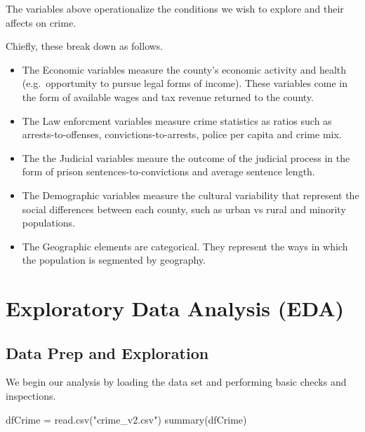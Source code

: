 \documentclass[]{article}
\newenvironment{Shaded}{}{}
\newcommand{\KeywordTok}[1]{\textcolor[rgb]{0.00,0.00,1.00}{#1}}
\newcommand{\NormalTok}[1]{#1}
\newcommand{\StringTok}[1]{\textcolor[rgb]{0.00,0.50,0.50}{#1}}
\begin{document}
The variables above operationalize the conditions we wish to explore and
their affects on crime.

Chiefly, these break down as follows.

\begin{itemize}
\item
  The Economic variables measure the county's economic activity and
  health (e.g.~opportunity to pursue legal forms of income). These
  variables come in the form of available wages and tax revenue returned
  to the county.
\item
  The Law enforcment variables measure crime statistics as ratios such
  as arrests-to-offenses, convictions-to-arrests, police per capita and
  crime mix.
\item
  The the Judicial variables meaure the outcome of the judicial process
  in the form of prison sentences-to-convictions and average sentence
  length.
\item
  The Demographic variables measure the cultural variability that
  represent the social differences between each county, such as urban vs
  rural and minority populations.
\item
  The Geographic elements are categorical. They represent the ways in
  which the population is segmented by geography.
\end{itemize}

\hypertarget{exploratory-data-analysis-eda}{%
\section{Exploratory Data Analysis
(EDA)}\label{exploratory-data-analysis-eda}}

\hypertarget{data-prep-and-exploration}{%
\subsection{Data Prep and Exploration}\label{data-prep-and-exploration}}

We begin our analysis by loading the data set and performing basic
checks and inspections.

\begin{Shaded}
\begin{Highlighting}[]
\NormalTok{dfCrime =}\StringTok{ }\KeywordTok{read.csv}\NormalTok{(}\StringTok{"crime_v2.csv"}\NormalTok{)}
\KeywordTok{summary}\NormalTok{(dfCrime)}
\end{Highlighting}
\end{Shaded}
\end{document}
